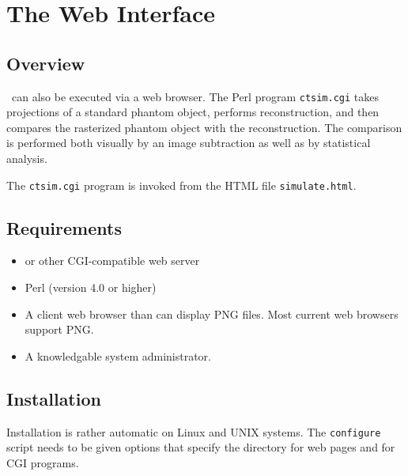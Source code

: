 \chapter{The Web Interface}\label{webinterface}%
%
\ctsimfooter%

\section{Overview}
\ctsim\ can also be executed via a web browser. The Perl program
\texttt{ctsim.cgi} takes projections of a standard phantom object,
performs reconstruction, and then compares the rasterized phantom
object with the reconstruction. The comparison is performed both
visually by an image subtraction as well as by statistical
analysis.

The \texttt{ctsim.cgi} program is invoked from the HTML file
\texttt{simulate.html}.

\section{Requirements}
   \begin{itemize}\itemsep=0pt
      \item {} or other CGI-compatible web server

      \item Perl (version 4.0 or higher)

      \item A client web browser than can display PNG files. Most
      current web browsers support PNG.

      \item A knowledgable system administrator.
\end{itemize}

\section{Installation}
Installation is rather automatic on Linux and UNIX systems. The
\texttt{configure} script needs to be given options that specify
the directory for web pages and for CGI programs.
